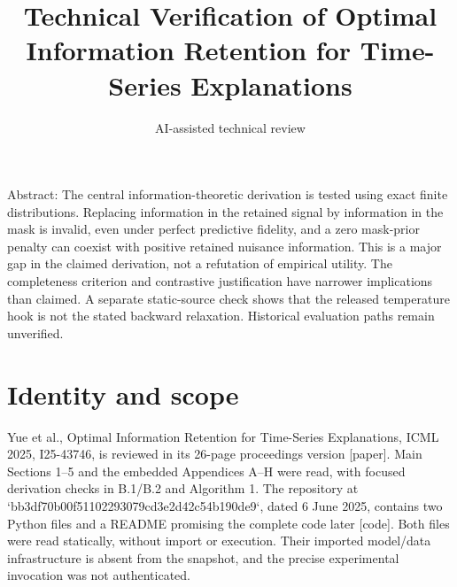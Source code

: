 \documentclass[10pt]{article}
\title{Technical Verification of
Optimal Information Retention for Time-Series Explanations}
\author{AI-assisted technical review}
\date{}
\begin{document}
\maketitle
Abstract: The central information-theoretic derivation is tested using exact finite distributions. Replacing information in the retained signal by information in the mask is invalid, even under perfect predictive fidelity, and a zero mask-prior penalty can coexist with positive retained nuisance information. This is a major gap in the claimed derivation, not a refutation of empirical utility. The completeness criterion and contrastive justification have narrower implications than claimed. A separate static-source check shows that the released temperature hook is not the stated backward relaxation. Historical evaluation paths remain unverified.\par
\section*{Identity and scope}
Yue et al., Optimal Information Retention for Time-Series Explanations, ICML 2025, I25-43746, is reviewed in its 26-page proceedings version [paper]. Main Sections 1–5 and the embedded Appendices A–H were read, with focused derivation checks in B.1/B.2 and Algorithm 1. The repository at `bb3df70b00f51102293079cd3e2d42c54b190de9`, dated 6 June 2025, contains two Python files and a README promising the complete code later [code]. Both files were read statically, without import or execution. Their imported model/data infrastructure is absent from the snapshot, and the precise experimental invocation was not authenticated.\par
\end{document}
